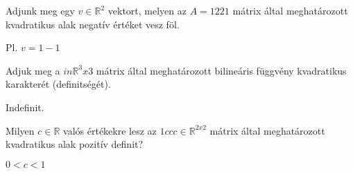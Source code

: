 \begin{frame}
  \begin{tcolorbox}[title={12/2. -R-}]
     Adjunk meg egy $v \in \mathbb{R}^2$ vektort, melyen az $A =  1 2 2 1$  mátrix által meghatározott kvadratikus alak negatív értéket vesz föl.


  \tcblower

    \mmedskip 
    
    Pl. $v =   1 -1 $
  \end{tcolorbox}
\end{frame}


\begin{frame}
  \begin{tcolorbox}[title={12/3. -R-}]
     Adjuk meg a   $in \mathbb{R}^3x$3 mátrix által meghatározott bilineáris függvény kvadratikus karakterét (definitségét).


  \tcblower

    \mmedskip 
    
    Indefinit.
  \end{tcolorbox}
\end{frame}


\begin{frame}
  \begin{tcolorbox}[title={12/4. -N-}]
     Milyen $c \in \mathbb{R}$ valós értékekre lesz az $1 c c c \in \mathbb{R}^{2 x 2}$ mátrix által meghatározott kvadratikus alak pozitív definit?

  \tcblower

    \mmedskip 
    
    $0 < c < 1$
  \end{tcolorbox}
\end{frame}


